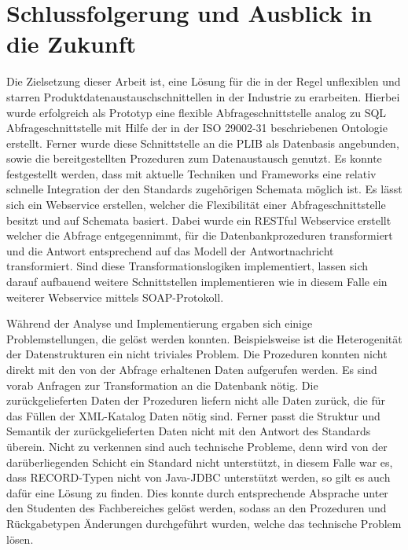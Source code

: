 \chapter*{Schlussfolgerung und Ausblick in die Zukunft}


Die Zielsetzung dieser Arbeit ist, eine Lösung für die in der Regel unflexiblen und starren Produktdatenaustauschschnittellen in der Industrie zu erarbeiten. Hierbei wurde erfolgreich als Prototyp eine flexible \gls{Abfrageschnittstelle} analog zu SQL \gls{Abfrageschnittstelle} mit Hilfe der in der ISO 29002-31 beschriebenen \gls{Ontologie} erstellt. Ferner wurde diese Schnittstelle an die \gls{PLIB} als Datenbasis angebunden, sowie die bereitgestellten Prozeduren zum Datenaustausch genutzt. Es konnte festgestellt werden, dass mit aktuelle Techniken und Frameworks eine relativ schnelle Integration der den Standards zugehörigen Schemata möglich ist. Es lässt sich ein \gls{Webservice} erstellen, welcher die Flexibilität einer \gls{Abfrageschnittstelle} besitzt und auf Schemata basiert. Dabei wurde ein \gls{REST}ful \gls{Webservice} erstellt welcher die Abfrage entgegennimmt, für die Datenbankprozeduren transformiert und die Antwort entsprechend auf das Modell der Antwortnachricht transformiert. Sind diese Transformationslogiken implementiert, lassen sich darauf aufbauend weitere Schnittstellen implementieren wie in diesem Falle ein weiterer \gls{Webservice} mittels \gls{SOAP}-Protokoll. 

Während der Analyse und Implementierung ergaben sich einige Problemstellungen, die gelöst werden konnten. Beispielsweise ist die Heterogenität der Datenstrukturen ein nicht triviales Problem. Die Prozeduren konnten nicht direkt mit den von der Abfrage erhaltenen Daten aufgerufen werden. Es sind vorab Anfragen zur Transformation an die Datenbank nötig. 
Die zurückgelieferten Daten der Prozeduren liefern nicht alle Daten zurück, die für das Füllen der XML-Katalog Daten nötig sind. Ferner passt die Struktur und Semantik der zurückgelieferten Daten nicht mit den Antwort des Standards überein. Nicht zu verkennen sind auch technische Probleme, denn wird von der darüberliegenden Schicht ein Standard nicht unterstützt, in diesem Falle war es, dass RECORD-Typen nicht von Java-JDBC unterstützt werden, so gilt es auch dafür eine Lösung zu finden. 
Dies konnte durch entsprechende Absprache unter den Studenten des Fachbereiches gelöst werden, sodass an den Prozeduren und Rückgabetypen Änderungen durchgeführt wurden, welche das technische Problem lösen.

